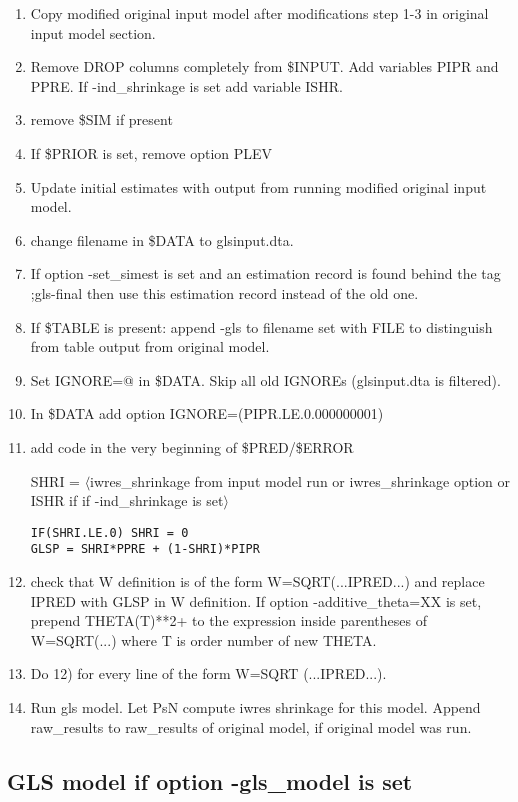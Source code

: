 \begin{enumerate}
\item Copy modified original input model after modifications step 1-3 in original input model section.
\item Remove DROP columns completely from \$INPUT. Add variables PIPR and PPRE. If -ind\_shrinkage is set add variable ISHR. 
\item remove \$SIM if present
\item If \$PRIOR is set, remove option PLEV
\item Update initial estimates with output from running modified original input model.
\item change filename in \$DATA to glsinput.dta.
\item If option -set\_simest is set and an estimation record is found behind the tag ;gls-final then use this estimation record instead of the old one.
\item If \$TABLE is present: append -gls to filename set with FILE to distinguish from table output from original model.
\item Set IGNORE=@ in \$DATA. Skip all old IGNOREs (glsinput.dta is filtered). 
\item In \$DATA add option IGNORE=(PIPR.LE.0.000000001)
\item add code in the very beginning of \$PRED/\$ERROR  

SHRI = $\langle$iwres\_shrinkage from input model run or iwres\_shrinkage option or ISHR if if -ind\_shrinkage is set$\rangle$ 
\begin{verbatim}
IF(SHRI.LE.0) SHRI = 0
GLSP = SHRI*PPRE + (1-SHRI)*PIPR
\end{verbatim}
\item check that W definition is of the form W=SQRT(...IPRED...) and replace IPRED with GLSP in W definition. If option -additive\_theta=XX is set, prepend THETA(T)**2+  to the expression inside parentheses of W=SQRT(...)  where T is order number of new THETA.
\item Do 12) for every line of the form W=SQRT (...IPRED...).
\item Run gls model. Let PsN compute iwres shrinkage for this model. Append raw\_results to raw\_results of original model, if original model was run.
\end{enumerate}

\subsection{GLS model if option -gls\_model is set}

